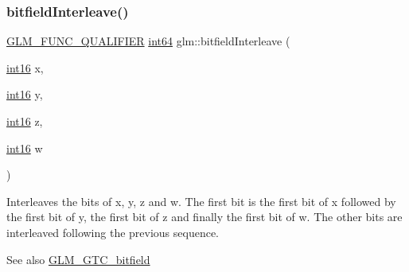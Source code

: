 \subsubsection{\texorpdfstring{bitfield\+Interleave()}{bitfieldInterleave()}\hspace{0.1cm}{\footnotesize\ttfamily [15/16]}}
{\footnotesize\ttfamily \mbox{\hyperlink{setup_8hpp_a33fdea6f91c5f834105f7415e2a64407}{G\+L\+M\+\_\+\+F\+U\+N\+C\+\_\+\+Q\+U\+A\+L\+I\+F\+I\+ER}} \mbox{\hyperlink{group__gtc__type__precision_ga435d75819cce297cc5fa21bd84ef89a5}{int64}} glm\+::bitfield\+Interleave (\begin{DoxyParamCaption}\item[{\mbox{\hyperlink{group__gtc__type__precision_ga2945a61d12771f8954994fcddf02b021}{int16}}}]{x,  }\item[{\mbox{\hyperlink{group__gtc__type__precision_ga2945a61d12771f8954994fcddf02b021}{int16}}}]{y,  }\item[{\mbox{\hyperlink{group__gtc__type__precision_ga2945a61d12771f8954994fcddf02b021}{int16}}}]{z,  }\item[{\mbox{\hyperlink{group__gtc__type__precision_ga2945a61d12771f8954994fcddf02b021}{int16}}}]{w }\end{DoxyParamCaption})}

Interleaves the bits of x, y, z and w. The first bit is the first bit of x followed by the first bit of y, the first bit of z and finally the first bit of w. The other bits are interleaved following the previous sequence.

\begin{DoxySeeAlso}{See also}
\mbox{\hyperlink{group__gtc__bitfield}{G\+L\+M\+\_\+\+G\+T\+C\+\_\+bitfield}} 
\end{DoxySeeAlso}
\mbox{\label{group__gtc__bitfield_gac8a926a7bfd9b23c22a4f685193fbfe1}} 
